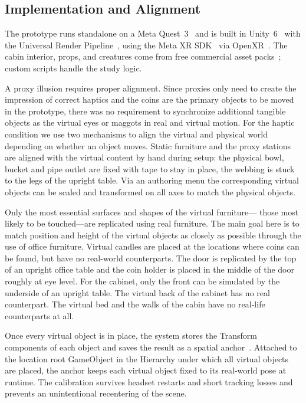 
\subsection{Implementation and Alignment}
\label{sec:apparatus-implementation}

The prototype runs standalone on a Meta Quest~3~\cite{quest3} and is built in Unity~6~\cite{unity} with the Universal Render Pipeline~\cite{unity-urp}, using the Meta XR SDK~\cite{meta-xr-sdk} via OpenXR~\cite{openxr}. The cabin interior, props, and creatures come from free commercial asset packs~\cite{unity-asset-store, fab}; custom scripts handle the study logic.

A proxy illusion requires proper alignment. Since proxies only need to create the impression of correct haptics and the coins are the primary objects to be moved in the prototype, there was no requirement to synchronize additional tangible objects as the virtual eyes or maggots in real and virtual motion. For the haptic condition we use two mechanisms to align the virtual and physical world depending on whether an object moves. Static furniture and the proxy stations are aligned with the virtual content by hand during setup: the physical bowl, bucket and pipe outlet are fixed with tape to stay in place, the webbing is stuck to the legs of the upright table. Via an authoring menu the corresponding virtual objects can be scaled and transformed on all axes to match the physical objects.

Only the most essential surfaces and shapes of the virtual furni\-ture--- those most likely to be touched---are replicated using real furniture. The main goal here is to match position and height of the virtual objects as closely as possible through the use of office furniture.  Virtual candles are placed at the locations where coins can be found, but have no real-world counterparts. The door is replicated by the top of an upright office table and the coin holder is placed in the middle of the door roughly at eye level. For the cabinet, only the front can be simulated by the underside of an upright table. The virtual back of the cabinet has no real counterpart. The virtual bed and the walls of the cabin have no real-life counterparts at all.

Once every virtual object is in place, the system stores the Transform components of each object and saves the result as a spatial anchor~\cite{meta-spatial-anchors}. Attached to the location root GameObject in the Hierarchy under which all virtual objects are placed, the anchor keeps each virtual object fixed to its real-world pose at runtime. The calibration survives headset restarts and short tracking losses and prevents an unintentional recentering of the scene.

